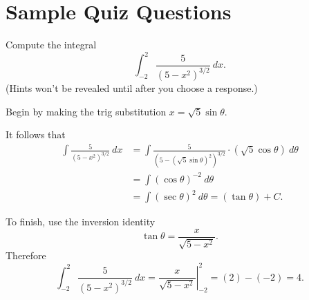 \documentclass{ximera}
\begin{document}
\section*{Sample Quiz Questions}
\begin{question}%

Compute the integral 
\[\int_{-2}^{2}\frac{5}{(5-x^2)^{3/2}}~dx.\]
(Hints won't be revealed until after you choose a response.)
\begin{multiplechoice}
\end{multiplechoice}
\begin{feedback}
Begin by making the trig substitution \(x=\sqrt{5}\sin \theta\). \begin{hint} It follows that 
\[ \begin{aligned} \int\frac{5}{(5-x^2)^{3/2}}~dx & = \int \frac{5}{(5-(\sqrt{5}\sin \theta)^2)^{3/2}} \cdot (\sqrt{5}\cos \theta)~d \theta \\
 & = \int (\cos \theta)^{-2}~d \theta \\ & = \int (\sec \theta)^{2} ~ d \theta = (\tan \theta) + C. \end{aligned} \] \begin{hint}
To finish, use the inversion identity \[\tan \theta = \frac{x}{\sqrt{5-x^2}}.\]
Therefore \[\int_{-2}^{2}\frac{5}{(5-x^2)^{3/2}}~dx = \left.\frac{x}{\sqrt{5-x^2}}\right|_{-2}^{2} = \left(2\right) - \left(-2\right) = 4.\] \end{hint} \end{hint}
\end{feedback}

\end{question}
\end{document}
